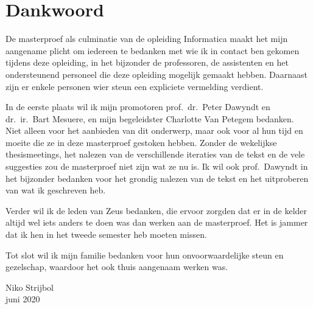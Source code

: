 \chapter*{Dankwoord}\label{ch:dankwoord}

De masterproef als culminatie van de opleiding Informatica maakt het mijn aangename plicht om iedereen te bedanken met wie ik in contact ben gekomen tijdens deze opleiding, in het bijzonder de professoren, de assistenten en het ondersteunend personeel die deze opleiding mogelijk gemaakt hebben.
Daarnaast zijn er enkele personen wier steun een expliciete vermelding verdient.

In de eerste plaats wil ik mijn promotoren prof.\ dr.\ Peter Dawyndt en dr.\ ir.\ Bart Mesuere, en mijn begeleidster Charlotte Van Petegem bedanken.
Niet alleen voor het aanbieden van dit onderwerp, maar ook voor al hun tijd en moeite die ze in deze masterproef gestoken hebben.
Zonder de wekelijkse thesismeetings, het nalezen van de verschillende iteraties van de tekst en de vele suggesties zou de masterproef niet zijn wat ze nu is.
Ik wil ook prof.\ Dawyndt in het bijzonder bedanken voor het grondig nalezen van de tekst en het uitproberen van wat ik geschreven heb.

Verder wil ik de leden van Zeus  bedanken, die ervoor zorgden dat er in de kelder altijd wel iets anders te doen was dan werken aan de masterproef.
Het is jammer dat ik hen in het tweede semester heb moeten missen.

Tot slot wil ik mijn familie bedanken voor hun onvoorwaardelijke steun en gezelschap, waardoor het ook thuis aangenaam werken was.

\begin{flushright}
    Niko Strijbol\\
    juni 2020
\end{flushright}
